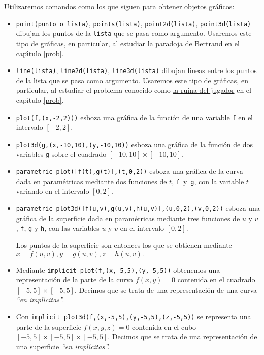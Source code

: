 Utilizaremos comandos como los que siguen para obtener objetos gráficos:
\begin{itemize}\itemsep=-1pt
\item  \lstinline|point(punto o lista)|, \lstinline|points(lista)|, %
\lstinline|point2d(lista)|, \lstinline|point3d(lista)| %
dibujan los puntos de la \lstinline|lista| que se pasa como
argumento. Usaremos este tipo de gráficas, en particular,  al estudiar la
\hyperref[bertrand]{paradoja de Bertrand} en el cap\'{\i}tulo \ref{prob}. 

\item  \lstinline|line(lista)|, \lstinline|line2d(lista)|, %
\lstinline|line3d(lista)| dibujan líneas entre los puntos de la lista que se
pasa como
argumento. Usaremos este tipo de gráficas, en particular,  al estudiar el
problema conocido como \hyperref[]{la ruina del jugador} en el cap\'{\i}tulo
\ref{prob}.

\item \lstinline|plot(f,(x,-2,2)))|  esboza una gráfica de la función de una
variable  %
\lstinline|f| en el intervalo $[-2,2]$.

\item \lstinline|plot3d(g,(x,-10,10),(y,-10,10))|  esboza una gráfica de la
función de dos variables  %
\lstinline|g| sobre el cuadrado  $[-10,10]\times [-10,10]$.

\item \lstinline|parametric_plot([f(t),g(t)],(t,0,2))|  esboza una gráfica de la
curva dada en param\'etricas mediante  dos funciones de $t$,    %
\lstinline|f|~y~\lstinline|g|,  con la variable $t$ variando en el intervalo
$[0,2]$.

\item \lstinline|parametric_plot3d([f(u,v),g(u,v),h(u,v)],(u,0,2),(v,0,2))| 
esboza una gráfica de la
superficie  dada en param\'etricas mediante  tres  funciones de $u$ y $v$,    %
\lstinline|f|, \lstinline|g| y \lstinline|h|,  con las variables $u$ y $v$  en 
el intervalo $[0,2]$.

Los puntos de la superficie son entonces los que se obtienen mediante
$x=f(u,v),y=g(u,v),z=h(u,v).$


\item Mediante \lstinline|implicit_plot(f,(x,-5,5),(y,-5,5))| obtenemos una
representaci\'on de la parte de  la curva $f(x,y)=0$ contenida en el
cuadrado $[-5,5]\times [-5,5]$. Decimos que se trata de una representaci\'on de
una curva {\itshape ``en impl\'{\i}citas''.}


\item Con \lstinline|implicit_plot3d(f,(x,-5,5),(y,-5,5),(z,-5,5))| 
se representa una parte de  la superficie $f(x,y,z)=0$ contenida en el
cubo $[-5,5]\times [-5,5]\times [-5,5]$. Decimos que se trata de una
representaci\'on de una superficie {\itshape ``en impl\'{\i}citas''.}

\end{itemize}

